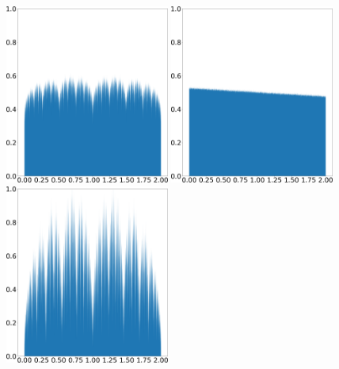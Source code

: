 \begin{figure}
    \centering
    \includegraphics[width=0.48\textwidth]{figure/tent_pinched_shadow_density_0.05.png}
    \hspace{0.02\textwidth}
    \includegraphics[width=0.48\textwidth]{figure/tent_pinched_physical_density_0.05.png}
    \\ \vspace{0.02\textwidth}
    \includegraphics[width=0.48\textwidth]{figure/tent_pinched_shadow_density_0.2.png}
    \hspace{0.02\textwidth}

\end{figure}
